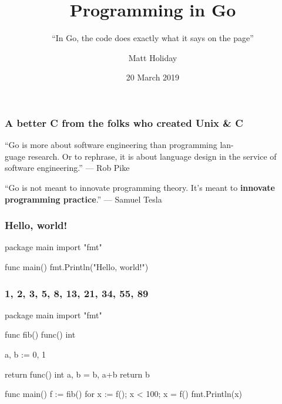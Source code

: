\documentclass[handout,compress,t,11pt]{beamer}
\title[Programming in Go]{\bf Programming in Go}
\author{Matt Holiday}
\institute[CP]{Cardinal Peak}
\date{20 March 2019}
\subtitle{``In Go, the code does exactly what it says on the page''}
\begin{document}
\frame{\titlepage} 

\begin{frame}
    \frametitle{A better C from the folks who created Unix \& C}
    { ``Go is more about software engineering than programming 
    lan-\\guage research. Or to rephrase, it is about language  design in the service of 
    software engineering.'' --- Rob Pike \\}
    \vspace{2\baselineskip}\par
    {``Go is not meant to innovate programming theory. It's meant to
    {\bf innovate programming practice}.'' --- Samuel Tesla \\}
    \vspace{3.4\baselineskip}
    
\end{frame}

\begin{frame}[fragile]
\frametitle{Hello, world!}
\begin{golang}
package main
import "fmt"

func main() {
    fmt.Println("Hello, world!")
}
\end{golang}
\end{frame}

\begin{frame}[fragile]
\frametitle{1, 2, 3, 5, 8, 13, 21, 34, 55, 89}
\begin{golang}
package main
import "fmt"

func fib() func() int {
	a, b := 0, 1

	return func() int {
		a, b = b, a+b
		return b
	}
}

func main() {
	f := fib()
	for x := f(); x < 100; x = f() {
		fmt.Println(x)
	}
}
\end{golang}
\end{frame}
\end{document}

